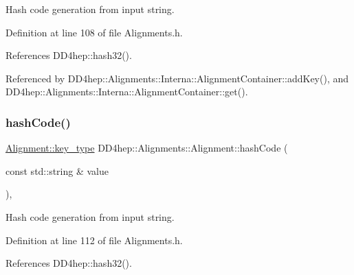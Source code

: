Hash code generation from input string. 



Definition at line 108 of file Alignments.\+h.



References D\+D4hep\+::hash32().



Referenced by D\+D4hep\+::\+Alignments\+::\+Interna\+::\+Alignment\+Container\+::add\+Key(), and D\+D4hep\+::\+Alignments\+::\+Interna\+::\+Alignment\+Container\+::get().

\hypertarget{class_d_d4hep_1_1_alignments_1_1_alignment_af5a53c031ebc0778ce96097696b4055c}{}\label{class_d_d4hep_1_1_alignments_1_1_alignment_af5a53c031ebc0778ce96097696b4055c} 
\subsubsection{\texorpdfstring{hash\+Code()}{hashCode()}\hspace{0.1cm}{\footnotesize\ttfamily [2/2]}}
{\footnotesize\ttfamily \hyperlink{class_d_d4hep_1_1_alignments_1_1_alignment_ab824a65f935a0c79b9ea1a7a85014b88}{Alignment\+::key\+\_\+type} D\+D4hep\+::\+Alignments\+::\+Alignment\+::hash\+Code (\begin{DoxyParamCaption}\item[{const std\+::string \&}]{value }\end{DoxyParamCaption})\hspace{0.3cm}{\ttfamily [inline]}, {\ttfamily [static]}}



Hash code generation from input string. 



Definition at line 112 of file Alignments.\+h.



References D\+D4hep\+::hash32().

\hypertarget{class_d_d4hep_1_1_alignments_1_1_alignment_a36b6f1a62fba3bee327eb4c2a19f89ae}{}\label{class_d_d4hep_1_1_alignments_1_1_alignment_a36b6f1a62fba3bee327eb4c2a19f89ae} 
